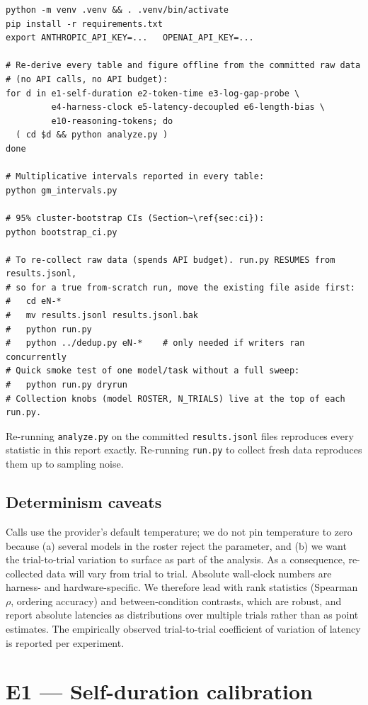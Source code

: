 \documentclass[11pt]{article}
\newcommand{\code}[1]{\texttt{\small #1}}
\begin{document}
\begin{lstlisting}
python -m venv .venv && . .venv/bin/activate
pip install -r requirements.txt
export ANTHROPIC_API_KEY=...   OPENAI_API_KEY=...

# Re-derive every table and figure offline from the committed raw data
# (no API calls, no API budget):
for d in e1-self-duration e2-token-time e3-log-gap-probe \
         e4-harness-clock e5-latency-decoupled e6-length-bias \
         e10-reasoning-tokens; do
  ( cd $d && python analyze.py )
done

# Multiplicative intervals reported in every table:
python gm_intervals.py

# 95% cluster-bootstrap CIs (Section~\ref{sec:ci}):
python bootstrap_ci.py

# To re-collect raw data (spends API budget). run.py RESUMES from results.jsonl,
# so for a true from-scratch run, move the existing file aside first:
#   cd eN-*
#   mv results.jsonl results.jsonl.bak
#   python run.py
#   python ../dedup.py eN-*    # only needed if writers ran concurrently
# Quick smoke test of one model/task without a full sweep:
#   python run.py dryrun
# Collection knobs (model ROSTER, N_TRIALS) live at the top of each run.py.
\end{lstlisting}

Re-running \code{analyze.py} on the committed \code{results.jsonl} files reproduces every
statistic in this report exactly. Re-running \code{run.py} to collect fresh data reproduces
them up to sampling noise.

\subsection{Determinism caveats}
\label{sec:determinism}

Calls use the provider's default temperature; we do not pin temperature to zero because (a)
several models in the roster reject the parameter, and (b) we want the trial-to-trial
variation to surface as part of the analysis. As a consequence, re-collected data will vary
from trial to trial. Absolute wall-clock numbers are harness- and hardware-specific. We
therefore lead with rank statistics (Spearman $\rho$, ordering accuracy) and between-condition
contrasts, which are robust, and report absolute latencies as distributions over multiple
trials rather than as point estimates. The empirically observed trial-to-trial coefficient of
variation of latency is reported per experiment.

\section{E1 --- Self-duration calibration}
\label{sec:e1}
\end{document}
